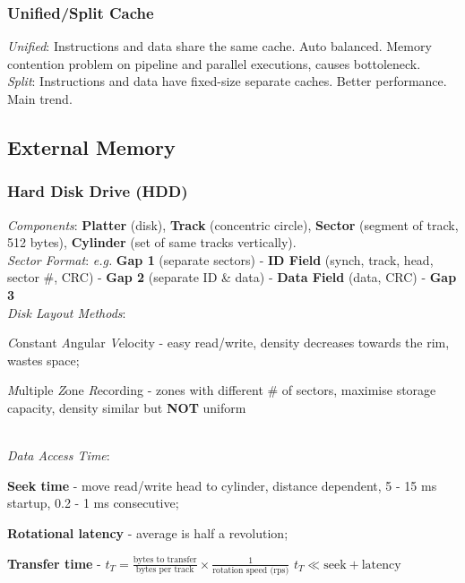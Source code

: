 \subsubsection*{Unified/Split Cache}
\emph{Unified}: Instructions and data share the same cache. Auto balanced. Memory contention problem on pipeline and parallel executions, causes bottoleneck.\\
\emph{Split}: Instructions and data have fixed-size separate caches. Better performance. Main trend.

\subsection*{External Memory}

\subsubsection*{Hard Disk Drive (HDD)}

\emph{Components}: \textbf{Platter} (disk), \textbf{Track} (concentric circle), \textbf{Sector} (segment of track, 512 bytes), \textbf{Cylinder} (set of same tracks vertically).\\
\emph{Sector Format}: {\footnotesize\itshape e.g.}
\textbf{Gap 1} (separate sectors) -
\textbf{ID Field} (synch, track, head, sector \#, CRC) -
\textbf{Gap 2} (separate ID \& data) -
\textbf{Data Field} (data, CRC) -
\textbf{Gap 3}\\
\emph{Disk Layout Methods}: \begin{enuminline}
\item \emph{C}onstant \emph{A}ngular \emph{V}elocity -
easy read/write, density decreases towards the rim, wastes space;
\item \emph{M}ultiple \emph{Z}one \emph{R}ecording -
zones with different \# of sectors, maximise storage capacity, density similar but \textbf{NOT} uniform
\end{enuminline}\\
\emph{Data Access Time}: \begin{enuminline}
\item \textbf{Seek time} - move read/write head to cylinder, distance dependent, 5 - 15 ms startup, 0.2 - 1 ms consecutive;
\item \textbf{Rotational latency} - average is half a revolution;
\item \textbf{Transfer time} - 
$t_T = \frac{\text{bytes to transfer}}{\text{bytes per track}} \times \frac{1}{\text{rotation speed (rps)}}$
$t_T\ll \text{seek}+\text{latency}$
\end{enuminline}